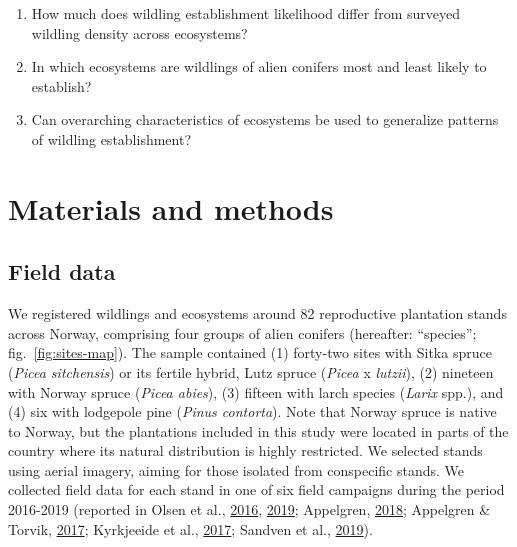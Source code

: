 \documentclass[
]{article}
\providecommand{\tightlist}{%
  \setlength{\itemsep}{0pt}\setlength{\parskip}{0pt}}
\begin{document}
\begin{enumerate}
\def\labelenumi{\arabic{enumi}.}
\tightlist
\item
  How much does wildling establishment likelihood differ from surveyed wildling density across ecosystems?
\item
  In which ecosystems are wildlings of alien conifers most and least likely to establish?
\item
  Can overarching characteristics of ecosystems be used to generalize patterns of wildling establishment?
\end{enumerate}

\hypertarget{materials-and-methods}{%
\section{Materials and methods}\label{materials-and-methods}}

\hypertarget{field-data}{%
\subsection{Field data}\label{field-data}}

We registered wildlings and ecosystems around 82 reproductive plantation stands across Norway, comprising four groups of alien conifers (hereafter: ``species''; fig.~\ref{fig:sites-map}).
The sample contained (1) forty-two sites with Sitka spruce (\emph{Picea sitchensis}) or its fertile hybrid, Lutz spruce (\emph{Picea} x \emph{lutzii}), (2) nineteen with Norway spruce (\emph{Picea abies}), (3) fifteen with larch species (\emph{Larix} spp.), and (4) six with lodgepole pine (\emph{Pinus contorta}).
Note that Norway spruce is native to Norway, but the plantations included in this study were located in parts of the country where its natural distribution is highly restricted.
We selected stands using aerial imagery, aiming for those isolated from conspecific stands.
We collected field data for each stand in one of six field campaigns during the period 2016-2019 (reported in Olsen et al., \protect\hyperlink{ref-olsenKartleggingAvKortdistansespredning2016}{2016}, \protect\hyperlink{ref-olsenKartleggingAvKortdistansespredning2019}{2019}; Appelgren, \protect\hyperlink{ref-appelgrenKartleggingAvKortdistansespredning2018}{2018}; Appelgren \& Torvik, \protect\hyperlink{ref-appelgrenKartleggingAvKortdistansespredning2017}{2017}; Kyrkjeeide et al., \protect\hyperlink{ref-kyrkjeeideKartleggingAvKortdistansespredning2017}{2017}; Sandven et al., \protect\hyperlink{ref-sandvenKartleggingAvKortdistansespredning2019}{2019}).
\end{document}
